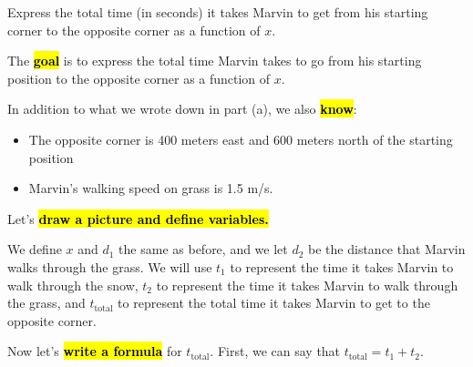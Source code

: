 \documentclass{article}
\begin{document}
\begin{enumerate}
\begin{enumerate}
    \begin{problem}[\vfill\newpage]
      Express the total time (in seconds) it takes Marvin to get from his starting corner to the opposite corner as a function of $x$.
    \end{problem}

    \begin{solution} 
    The \hl{\textbf{goal}} is to express the total time Marvin takes to go from his starting position 
    to the opposite corner as a function of $x$. 
    
    In addition to what we wrote down in part (a), we also \hl{\textbf{know}}:
    \begin{itemize}
      \item The opposite corner is 400 meters east and 600 meters north of the starting position
      \item Marvin's walking speed on grass is 1.5 m/s.
    \end{itemize}

    Let's \hl{\textbf{draw a picture and define variables.}}
    \begin{center}
    \end{center}

    We define $x$ and $d_1$ the same as before, and we let $d_2$ be the distance that Marvin walks through the grass.
    We will use $t_1$ to represent the time it takes Marvin to walk through the snow, $t_2$ to represent the time it takes
    Marvin to walk through the grass, and $t_\text{total}$ to represent the total time it takes Marvin to get to the
    opposite corner.

    Now let's \hl{\textbf{write a formula}} for $t_\text{total}$. First, we can say that $t_\text{total} = t_1 + t_2$. 


\end{solution}
\end{enumerate}
\end{enumerate}
\end{document}
